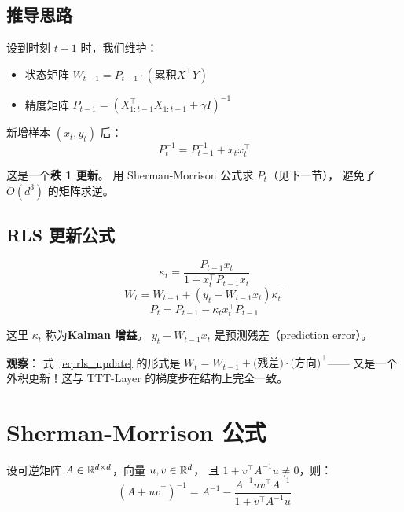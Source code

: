 \subsection{推导思路}

设到时刻 $t-1$ 时，我们维护：
\begin{itemize}
  \item 状态矩阵 $W_{t-1} = P_{t-1} \cdot (\text{累积} X^\top Y)$
  \item 精度矩阵 $P_{t-1} = (X_{1:t-1}^\top X_{1:t-1} + \gamma I)^{-1}$
\end{itemize}

新增样本 $(x_t, y_t)$ 后：
\[
  P_t^{-1} = P_{t-1}^{-1} + x_t x_t^\top
\]

这是一个\textbf{秩 1 更新}。
用 Sherman-Morrison 公式求 $P_t$（见下一节），
避免了 $O(d^3)$ 的矩阵求逆。

\subsection{RLS 更新公式}

\begin{equation}
  \kappa_t = \frac{P_{t-1} x_t}{1 + x_t^\top P_{t-1} x_t}
  \label{eq:rls_gain}
\end{equation}
\begin{equation}
  W_t = W_{t-1} + (y_t - W_{t-1} x_t) \kappa_t^\top
  \label{eq:rls_update}
\end{equation}
\begin{equation}
  P_t = P_{t-1} - \kappa_t x_t^\top P_{t-1}
  \label{eq:rls_precision}
\end{equation}

这里 $\kappa_t$ 称为\textbf{Kalman 增益}。
$y_t - W_{t-1} x_t$ 是预测残差（prediction error）。

\textbf{观察}：
式~\eqref{eq:rls_update} 的形式是
$W_t = W_{t-1} + \text{(残差)} \cdot \text{(方向)}^\top$——
又是一个外积更新！这与 TTT-Layer 的梯度步在结构上完全一致。

\section{Sherman-Morrison 公式}
\label{sec:app_sm}

\begin{theorem}
设可逆矩阵 $A \in \mathbb{R}^{d \times d}$，向量 $u, v \in \mathbb{R}^d$，
且 $1 + v^\top A^{-1} u \neq 0$，则：
\begin{equation}
  (A + uv^\top)^{-1} = A^{-1} - \frac{A^{-1} u v^\top A^{-1}}{1 + v^\top A^{-1} u}
  \label{eq:sherman_morrison}
\end{equation}
\end{theorem}

